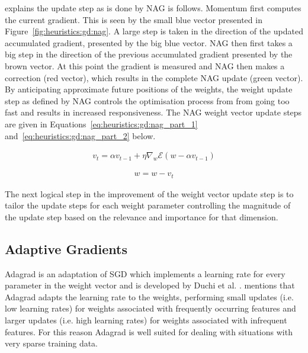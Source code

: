 \citeauthor{ref:ruder:2016} \cite{ref:ruder:2016} explains the update step as is done by \ac{NAG} is follows. \ac{Momentum} first computes the current gradient. This is seen by the small blue vector presented in Figure~\ref{fig:heuristics:gd:nag}. A large step is taken in the direction of the updated accumulated gradient, presented by the big blue vector. \ac{NAG} then first takes a big step in the direction of the previous accumulated gradient presented by the brown vector. At this point the gradient is measured and \ac{NAG} then makes a correction (red vector), which results in the complete NAG update (green vector). By anticipating approximate future positions of the weights, the weight update step as defined by \ac{NAG} controls the optimisation process from from going too fast and results in increased responsiveness. The \ac{NAG} weight vector update steps are given in Equations~\ref{eq:heuristics:gd:nag_part_1} and~\ref{eq:heuristics:gd:nag_part_2} below.

\begin{equation}
      \label{eq:heuristics:gd:nag_part_1}
      \begin{split}
            v_{t} = \alpha v_{t-1} + \eta \nabla_{w}\mathcal{E}(w - \alpha v_{t-1})
      \end{split}
\end{equation}

\begin{equation}
      \label{eq:heuristics:gd:nag_part_2}
      \begin{split}
            w = w - v_{t}
      \end{split}
\end{equation}

The next logical step in the improvement of the weight vector update step is to tailor the update steps for each weight parameter controlling the magnitude of the update step based on the relevance and importance for that dimension.

\subsection{Adaptive Gradients}
\label{sec:heuristics:adagrad}

\Acl{Adagrad} is an adaptation of \ac{SGD} which implements a learning rate for every parameter in the weight vector and is developed by Duchi et al. \cite{ref:duchi:2011}. \citeauthor{ref:ruder:2016} \cite{ref:ruder:2016} mentions that \Ac{Adagrad} adapts the learning rate to the weights, performing small updates (i.e. low learning rates) for weights associated with frequently occurring features and larger updates (i.e. high learning rates) for weights associated with infrequent features. For this reason \ac{Adagrad} is well suited for dealing with situations with very sparse training data.

